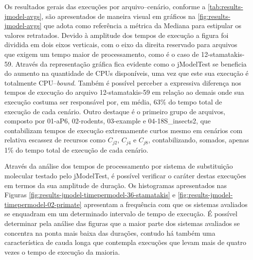 \documentclass[english,brazilian]{UNISINOSmonografia} %
\begin{document}
{\begin{figure}[bt]
\begin{minipage}{.52\textwidth}
	\end{minipage}
\end{figure}
}



Os resultados gerais das execuções por arquivo--cenário, conforme a \autoref{tab:results-jmodel-avgs}, são apresentados de maneira visual em gráficos na \autoref{fig:results-jmodel-avgs} que adota como referência a métrica da Mediana para estipular os valores retratados.
%
Devido à amplitude dos tempos de execução a figura foi dividida em dois eixos verticais, com o eixo da direita reservado para arquivos que exigem um tempo maior de processamento, como é o caso de 12-stamatakis-59.
%
Através da representação gráfica fica evidente como o jModelTest se beneficia do aumento na quantidade de CPUs disponíveis, uma vez que este sua execução é totalmente CPU--\textit{bound}.
%
Também é possível perceber a expressiva diferença nos tempos de execução do arquivo 12-stamatakis-59 em relação ao demais onde sua execução costuma ser responsável por, em média, 63\% do tempo total de execução de cada cenário.
%
Outro destaque é o primeiro grupo de arquivos, composto por 01-aP6, 02-rodents, 03-example e 04-18S\_insects2, que contabilizam tempos de execução extremamente curtos mesmo em cenários com relativa escassez de recursos como $C_{j2}$, $C_{j4}$ e $C_{j8}$, contabilizando, somados, apenas 1\% do tempo total de execução de cada cenário.


Através da análise dos tempos de processamento por sistema de substituição molecular testado pelo jModelTest, é possível verificar o caráter destas execuções em termos da sua amplitude de duração.
%
Os histogramas apresentados nas Figuras \ref{fig:results-jmodel-timepermodel-36-stamatakis} e \ref{fig:results-jmodel-timepermodel-02-primate} apresentam a frequência com que os sistemas avaliados se enquadram em um determinado intervalo de tempo de execução.
%
É possível determinar pela análise das figuras que a maior parte dos sistemas avaliados se concentra na ponta mais baixa das durações, contudo há também uma característica de cauda longa que contempla execuções que levam mais de quatro vezes o tempo de execução da maioria.
\end{document}
